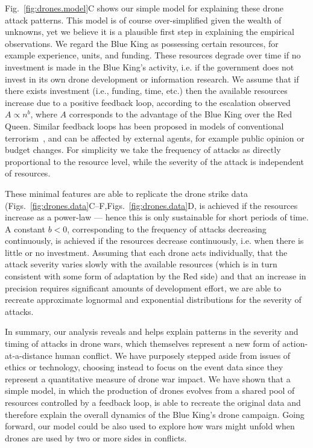 \documentclass[preprint,12pt]{elsarticle}
\begin{document}
Fig.~\ref{fig:drones.model}C shows our simple model for explaining these drone attack patterns. This model is of course over-simplified given the wealth of unknowns, yet we believe it is a plausible first step in explaining the empirical observations. We regard the Blue King as possessing
certain resources, for example experience, units, and funding. These
resources degrade over time if no investment is made in the Blue
King's activity, i.e. if the government does not invest in its own
drone development or information research. We assume that if there exists
investment (i.e., funding, time, etc.) then the available resources increase due to a
positive feedback loop, according to the escalation observed $A \propto n^b$, 
where $A$ corresponds to the advantage of the Blue King over the Red Queen. Similar feedback loops has been proposed
in models of conventional terrorism~\cite{Clauset2012}, and can be
affected by external agents, for example public opinion or budget changes. For simplicity we take the
frequency of attacks as directly proportional to the resource level,
while the severity of the attack is independent of resources. 

These minimal features are able to replicate the drone strike data
(Figs.~\ref{fig:drones.data}C--F,Figs.~\ref{fig:drones.data}D, is achieved if the
resources increase as a power-law --- hence this is only sustainable for
short periods of time. A constant $b<0$, corresponding to the
frequency of attacks decreasing continuously, is achieved if the
resources decrease continuously, i.e. when there is little or no
investment. Assuming that each drone acts individually, that the attack
severity varies slowly with the available resources (which is in turn
consistent with some form of adaptation by the Red side) and that an increase in precision
requires significant amounts
of development effort, we are able to recreate approximate
lognormal and exponential distributions for the severity of attacks. 

In summary, our analysis reveals and helps explain patterns in the severity and
timing of attacks in drone wars, which themselves represent a new form
of action-at-a-distance human conflict. We have purposely stepped
aside from issues of ethics or technology, choosing instead to focus
on the event data since they represent a quantitative measure of drone
war impact. We have shown that a simple model, in which the production of
drones evolves from a shared pool of resources controlled by a
feedback loop, is able to recreate the original data and therefore
explain the overall dynamics of the Blue King's drone campaign.
Going forward, our model could be also used to 
explore how wars might unfold when drones are used 
by two or more sides in conflicts.
\end{document}
